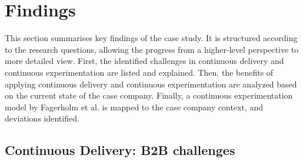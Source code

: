 \documentclass[english]{tktltiki2}
\theoremstyle{definition}
\theoremstyle{remark}
\begin{document}
\section{Findings}
This section summarises key findings of the case study. It is structured according to the research questions, allowing the progress from a higher-level perspective to more detailed view. First, the identified challenges in continuous delivery and continuous experimentation are listed and explained. Then, the benefits of applying continuous delivery and continuous experimentation are analyzed based on the current state of the case company. Finally, a continuous experimentation model by Fagerholm et al. \cite{fagerholm2014building} is mapped to the case company context, and deviations identified.


%




\subsection{Continuous Delivery: B2B challenges}
\end{document}

